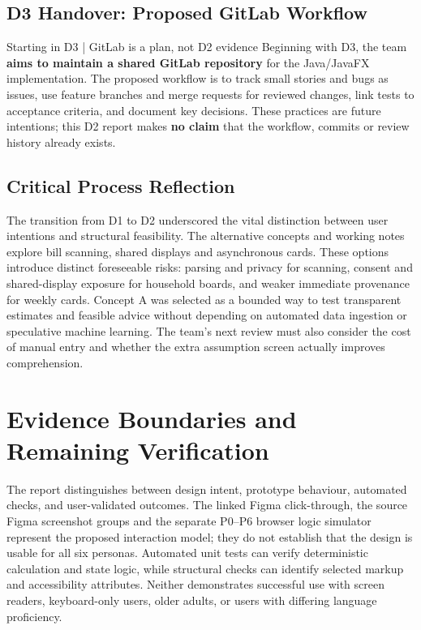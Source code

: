 \documentclass[12pt,a4paper]{article}
\begin{document}
\subsection{D3 Handover: Proposed GitLab Workflow}
\begin{insightbox}{Starting in D3 | GitLab is a plan, not D2 evidence}
Beginning with D3, the team \textbf{aims to maintain a shared GitLab repository} for the Java/JavaFX implementation. The proposed workflow is to track small stories and bugs as issues, use feature branches and merge requests for reviewed changes, link tests to acceptance criteria, and document key decisions. These practices are future intentions; this D2 report makes \textbf{no claim} that the workflow, commits or review history already exists.
\end{insightbox}

\subsection{Critical Process Reflection}
The transition from D1 to D2 underscored the vital distinction between user intentions and structural feasibility. The alternative concepts and working notes explore bill scanning, shared displays and asynchronous cards. These options introduce distinct foreseeable risks: parsing and privacy for scanning, consent and shared-display exposure for household boards, and weaker immediate provenance for weekly cards. Concept A was selected as a bounded way to test transparent estimates and feasible advice without depending on automated data ingestion or speculative machine learning. The team's next review must also consider the cost of manual entry and whether the extra assumption screen actually improves comprehension.

\section{Evidence Boundaries and Remaining Verification}

The report distinguishes between design intent, prototype behaviour, automated checks, and user-validated outcomes. The linked Figma click-through, the source Figma screenshot groups and the separate P0--P6 browser logic simulator represent the proposed interaction model; they do not establish that the design is usable for all six personas. Automated unit tests can verify deterministic calculation and state logic, while structural checks can identify selected markup and accessibility attributes. Neither demonstrates successful use with screen readers, keyboard-only users, older adults, or users with differing language proficiency.
\end{document}
